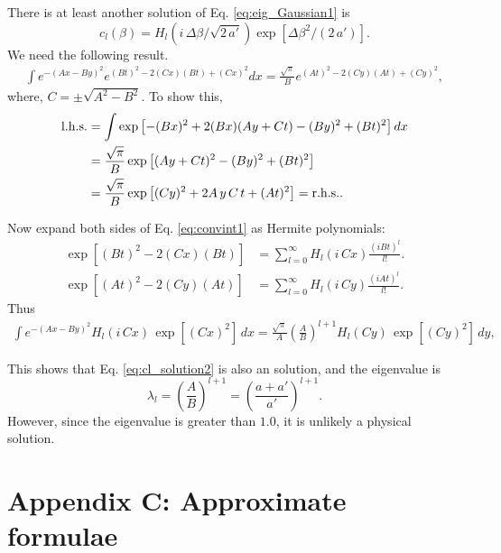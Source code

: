 \documentclass[aip,jcp,preprint,notitlepage, superscriptaddress]{revtex4-1}
\begin{document}
There is at least another solution of
Eq. \eqref{eq:eig_Gaussian1}
is
\begin{equation}
c_l(\beta) =
H_l(i \, \Delta\beta/\sqrt{2\,a'})
\exp[
  \Delta \beta^2 / (2 \, a')
].
\label{eq:cl_solution2}
\end{equation}
%
We need the following result.
%
\begin{align}
\int
e^{
  -(A x - B y)^2
}
e^{
  (B t)^2 - 2 (C x) (B t) + (C x)^2
}
d x
=
\frac{ \sqrt \pi } { B }
e^{
  (A t)^2 - 2 (C y) (A t) + (C y)^2
},
\label{eq:convint2}
\end{align}
where,
$C = \pm\sqrt{A^2 - B^2}$.
%
To show this,
%
\begin{align*}
\mathrm{l.h.s.}
&=
\int
\exp\left[
  -(B x)^2 + 2 (B x) (A y + C t)
  -(B y)^2 + (B t)^2
\right]
d x
\notag \\
&=
\frac{ \sqrt \pi } { B }
\exp\left[
  (A y + C t)^2 - (B y)^2 + (B t)^2
\right]
\notag \\
&=
\frac{ \sqrt \pi }{ B }
\exp\left[
  (C y)^2 + 2 A \, y \, C \, t + (A t)^2
\right]
=
\mathrm{r.h.s.}
.
\end{align*}



Now expand both sides of Eq. \eqref{eq:convint1}
as Hermite polynomials:
%
\begin{align*}
\exp\left[
  (B t)^2 - 2 (C x) (B t)
\right]
&=
\sum_{l = 0}^\infty
  H_l(i \, C x) \frac{ (i B t)^l }{ l! }.
\\
\exp\left[
  (A t)^2 - 2 (C y) (A t)
\right]
&=
\sum_{l = 0}^\infty
  H_l(i \, C y) \frac{ (i A t)^l }{ l! }.
\end{align*}
%
Thus
%
\begin{align}
\int
e^{
  -(A x - B y)^2
}
H_l(i \, C x) \,
\exp[ (C x)^2 ] \, d x
=
\frac{ \sqrt \pi } { A }
\left(
  \frac A B
\right)^{l + 1}
H_l(C y) \,
\exp[ (C y)^2 ] \, d y,
\label{eq:convint2_Hermite}
\end{align}



This shows that
Eq. \eqref{eq:cl_solution2}
is also an solution,
and the eigenvalue is
\begin{equation}
\lambda_l
=
\left( \frac{ A }{ B } \right)^{l + 1}
=
\left( \frac{ a + a' }{ a' } \right)^{l + 1}.
\end{equation}
%
However,
since the eigenvalue is greater than $1.0$,
it is unlikely a physical solution.




\section{Appendix C: Approximate formulae}
\end{document}
